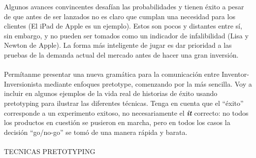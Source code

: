 \documentclass{article}
\begin{document}
Algunos avances convincentes desaf\'ian las probabilidades y tienen \'exito a pesar de que antes de ser lanzados no es claro que cumplan una necesidad para los clientes (El iPad de Apple es un ejemplo). Estos son pocos y distantes entre s\'i, sin embargo, y no pueden ser tomados como un indicador de infalibilidad (Lisa y Newton de Apple). La forma m\'as inteligente de jugar es dar prioridad a las pruebas de la demanda actual del mercado antes de hacer una gran inversi\'on.
\\ \\
Perm\'itanme presentar una nueva gram\'atica para la comunicaci\'on entre Inventor-Inversionista mediante enfoques pretotype, comenzando por la m\'as sencilla. Voy a incluir en algunos ejemplos de la vida real de historias de \'exito usando pretotyping para ilustrar las diferentes t\'ecnicas. Tenga en cuenta que el ``\'exito'' corresponde a un experimento exitoso, no necesariamente el \textbf{\textit{it}} correcto: no todos los productos en cuesti\'on se pusieron en marcha, pero en todos los casos la decisi\'on ``go/no-go'' se tom\'o de una manera r\'apida y barata.
\\ \\
TECNICAS PRETOTYPING
\\ \\
\end{document}
